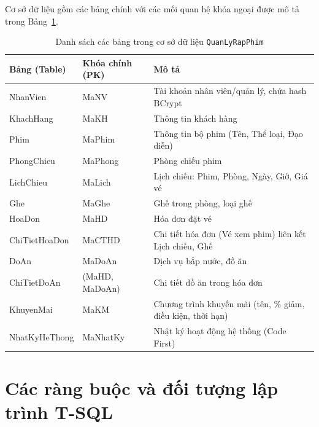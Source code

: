 \documentclass[12pt,a4paper,oneside]{book}
\theoremstyle{plain}
\numberwithin{equation}{chapter}
\begin{document}
\vspace{0.5cm}

\noindent Cơ sở dữ liệu gồm các bảng chính với các mối quan hệ khóa ngoại được mô tả trong Bảng~\ref{table_db}.

\begin{table}[H]
    \begin{center}
        \begin{tabular}{|l|l|l|}
            \hline
            \textbf{Bảng (Table)} & \textbf{Khóa chính (PK)} & \textbf{Mô tả} \\
            \hline
            NhanVien    & MaNV         & Tài khoản nhân viên/quản lý, chứa hash BCrypt \\
            \hline
            KhachHang   & MaKH         & Thông tin khách hàng \\
            \hline
            Phim        & MaPhim       & Thông tin bộ phim (Tên, Thể loại, Đạo diễn) \\
            \hline
            PhongChieu  & MaPhong      & Phòng chiếu phim \\
            \hline
            LichChieu   & MaLich       & Lịch chiếu: Phim, Phòng, Ngày, Giờ, Giá vé \\
            \hline
            Ghe         & MaGhe        & Ghế trong phòng, loại ghế \\
            \hline
            HoaDon      & MaHD         & Hóa đơn đặt vé \\
            \hline
            ChiTietHoaDon & MaCTHD     & Chi tiết hóa đơn (Vé xem phim) liên kết Lịch chiếu, Ghế \\
            \hline
            DoAn        & MaDoAn       & Dịch vụ bắp nước, đồ ăn \\
            \hline
            ChiTietDoAn & (MaHD, MaDoAn) & Chi tiết đồ ăn trong hóa đơn \\
            \hline
            KhuyenMai   & MaKM         & Chương trình khuyến mãi (tên, \% giảm, điều kiện, thời hạn) \\
            \hline
            NhatKyHeThong & MaNhatKy   & Nhật ký hoạt động hệ thống (Code First) \\
            \hline
        \end{tabular}
    \end{center}
    \caption{Danh sách các bảng trong cơ sở dữ liệu \texttt{QuanLyRapPhim}}\label{table_db}
\end{table}

\section{Các ràng buộc và đối tượng lập trình T-SQL}\label{Sec2.2}
\end{document}
